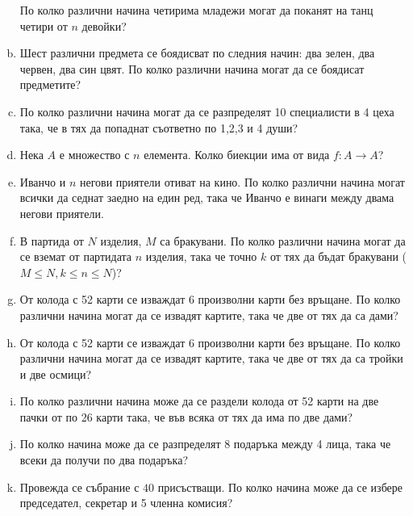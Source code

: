 \begin{problem}
\begin{enumerate}[a)]
    По колко различни начина четирима младежи могат да поканят на танц четири от $n$ девойки?
  \item
    Шест различни предмета се боядисват по следния начин: два зелен, два червен, два син цвят.
    По колко различни начина могат да се боядисат предметите?  
  \item
    По колко различни начина могат да се разпределят 10 специалисти в 4 цеха така, че в тях да попаднат съответно по 1,2,3 и 4 души?
  \item
    Нека $A$ е множество с $n$ елемента.
    Колко биекции има от вида $f:A\to A$?
  \item
    Иванчо и $n$ негови приятели отиват на кино.
    По колко различни начина могат всички да седнат заедно на един ред, така че Иванчо е винаги
    между двама негови приятели.
  \item
    В партида от $N$ изделия, $M$ са бракувани.
    По колко различни начина могат да се вземат от партидата $n$ изделия, така че точно $k$ от тях да бъдат бракувани ($M\leq N, k\leq n\leq N$)?
  \item
    От колода с 52 карти се изваждат 6 произволни карти без връщане.
    По колко различни начина могат да се извадят картите, така че две от тях да са дами?
  \item
    От колода с 52 карти се изваждат 6 произволни карти без връщане.
    По колко различни начина могат да се извадят картите, така че две от тях да са тройки и две осмици?
  \item
    По колко различни начина може да се раздели колода от 52 карти на две пачки от по 26 карти така, че във всяка от тях да има по две дами?
  \item
    По колко начина може да се разпределят 8 подаръка между 4 лица, така че всеки да получи по два подаръка?
  \item
    Провежда се събрание с $40$ присъстващи.
    По колко начина може да се избере председател, секретар и 5 членна комисия?
  \end{enumerate}
\end{problem}


